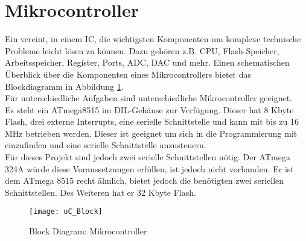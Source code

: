 \section{Mikrocontroller}
Ein  vereint, in einem IC, die wichtigsten Komponenten um komplexe technische Probleme leicht lösen zu können. Dazu gehören z.B. CPU, Flash-Speicher, Arbeitsspeicher, Register, Ports, ADC, DAC und mehr. Einen schematischen Überblick über die Komponenten eines Mikrocontrollers bietet das Blockdiagramm in Abbildung \ref{fig:uC_Blockdiagramm}. \\
Für unterschiedliche Aufgaben sind unterschiedliche Mikrocontroller geeignet.\\
Es steht ein ATmega8515\cite{atmel:8515} im DIL-Gehäuse zur Verfügung. Dieser hat 8 Kbyte Flash, drei externe Interrupts, eine serielle Schnittstelle und kann mit bis zu 16 MHz betrieben werden. 
Dieser ist geeignet um sich in die Programmierung mit  einzufinden und eine serielle Schnittstelle anzusteuern. \\
Für dieses Projekt sind jedoch zwei serielle Schnittstellen nötig. Der ATmega 324A\cite{atmel:324A} würde diese Voraussetzungen erfüllen, ist jedoch nicht vorhanden. Er ist dem ATmega 8515 recht ähnlich, bietet jedoch die benötigten zwei seriellen Schnittstellen. Des Weiteren hat er 32 Kbyte Flash. 
\begin{figure}[htb]
\centering
\texttt{[image: uC\_Block]}
\caption{Block Diagram: Mikrocontroller}
\label{fig:uC_Blockdiagramm}
\citep{atmel:ug_324A}
\end{figure}
